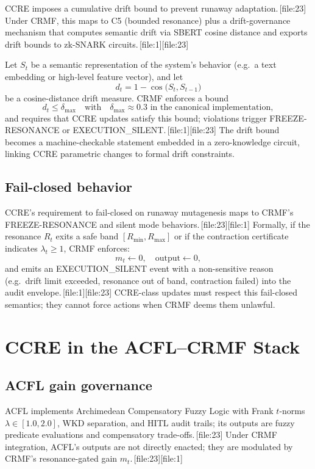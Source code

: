 \documentclass[11pt]{article}
\begin{document}
CCRE imposes a cumulative drift bound to prevent runaway adaptation.\,[file:23]
Under CRMF, this maps to C5 (bounded resonance) plus a drift-governance mechanism that computes semantic drift via SBERT cosine distance and exports drift bounds to zk-SNARK circuits.\,[file:1][file:23]

Let $S_t$ be a semantic representation of the system's behavior (e.g.\ a text embedding or high-level feature vector), and let
\[
  d_t = 1 - \cos\bigl(S_t, S_{t-1}\bigr)
\]
be a cosine-distance drift measure.
CRMF enforces a bound
\[
  d_t \le \delta_{\max} \quad\text{with}\quad \delta_{\max}\approx 0.3 \text{ in the canonical implementation},
\]
and requires that CCRE updates satisfy this bound; violations trigger FREEZE-RESONANCE or EXECUTION\_SILENT.\,[file:1][file:23]
The drift bound becomes a machine-checkable statement embedded in a zero-knowledge circuit, linking CCRE parametric changes to formal drift constraints.

\subsection{Fail-closed behavior}

CCRE's requirement to fail-closed on runaway mutagenesis maps to CRMF's FREEZE-RESONANCE and silent mode behaviors.\,[file:23][file:1]
Formally, if the resonance $R_t$ exits a safe band $[R_{\min},R_{\max}]$ or if the contraction certificate indicates $\lambda_t\ge 1$, CRMF enforces:
\[
  m_t \leftarrow 0,\quad \text{output} \leftarrow 0,
\]
and emits an EXECUTION\_SILENT event with a non-sensitive reason (e.g.\ drift limit exceeded, resonance out of band, contraction failed) into the audit envelope.\,[file:1][file:23]
CCRE-class updates must respect this fail-closed semantics; they cannot force actions when CRMF deems them unlawful.

\section{CCRE in the ACFL--CRMF Stack}

\subsection{ACFL gain governance}

ACFL implements Archimedean Compensatory Fuzzy Logic with Frank $t$-norms $\lambda\in[1.0,2.0]$, WKD separation, and HITL audit trails; its outputs are fuzzy predicate evaluations and compensatory trade-offs.\,[file:23]
Under CRMF integration, ACFL's outputs are not directly enacted; they are modulated by CRMF's resonance-gated gain $m_t$.\,[file:23][file:1]
\end{document}
